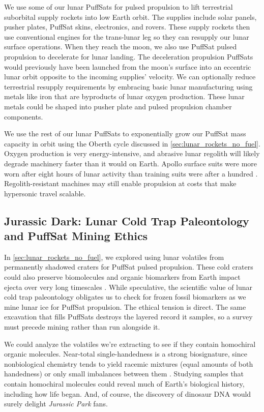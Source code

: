 \documentclass{article}
\begin{document}
We use some of our lunar PuffSats for pulsed propulsion to lift terrestrial suborbital supply rockets into low Earth orbit.  The supplies include solar panels, pusher plates, PuffSat skins, electronics, and rovers. These supply rockets then use conventional engines for the trans-lunar leg so they can resupply our lunar surface operations.   When they reach the moon, we also use PuffSat pulsed propulsion to decelerate for lunar landing.  The deceleration propulsion PuffSats would previously have been launched from the moon's surface into an eccentric lunar orbit opposite to the incoming supplies' velocity.   We can optionally reduce terrestrial resupply requirements by embracing basic lunar manufacturing using metals like iron that are byproducts of lunar oxygen production.  These lunar metals could be shaped into pusher plate and pulsed propulsion chamber components.  

We use the rest of our lunar PuffSats to exponentially grow our PuffSat mass capacity in orbit using the Oberth cycle discussed in \autoref{sec:lunar_rockets_no_fuel}.  Oxygen production is very energy-intensive, and abrasive lunar regolith will likely degrade machinery faster than it would on Earth. Apollo surface suits were more worn after eight hours of lunar activity than training suits were after a hundred \cite{gaier2005lunardust}.  Regolith-resistant machines may still enable propulsion at costs that make hypersonic travel scalable.

\subsection{Jurassic Dark: Lunar Cold Trap Paleontology and PuffSat Mining Ethics}\label{sec:jurassic_dark}
In \autoref{sec:lunar_rockets_no_fuel}, we explored using lunar volatiles from permanently shadowed craters for PuffSat pulsed propulsion. These cold craters could also preserve biomolecules and organic biomarkers from Earth impact ejecta over very long timescales \cite{dino_dna}. While speculative, the scientific value of lunar cold trap paleontology obligates us to check for frozen fossil biomarkers as we mine lunar ice for PuffSat propulsion. The ethical tension is direct. The same excavation that fills PuffSats destroys the layered record it samples, so a survey must precede mining rather than run alongside it.

We could analyze the volatiles we're extracting to see if they contain homochiral organic molecules. Near-total single-handedness is a strong biosignature, since nonbiological chemistry tends to yield racemic mixtures (equal amounts of both handedness) or only small imbalances between them \cite{glavin2020chiral}.   Studying samples that contain homochiral molecules could reveal much of Earth's biological history, including how life began. And, of course, the discovery of dinosaur DNA would surely delight \textit{Jurassic Park} \cite{jurassic_park} fans.
\end{document}
